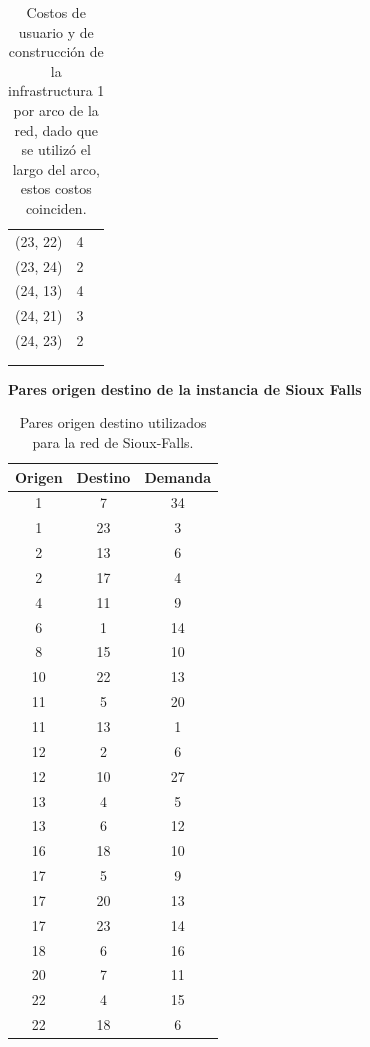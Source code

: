 \documentclass{article}
\begin{document}
\begin{table}[h!]
\begin{tabular}{ccc}
        (23, 22) & 4 \\
        (23, 24) & 2 \\
        (24, 13) & 4 \\
        (24, 21) & 3 \\
        (24, 23) & 2 \\
         & \\
         & \\
      \bottomrule
    \end{tabular}
    \caption{Costos de usuario y de construcción de la infrastructura 1 por arco de la red, dado que se utilizó el largo del arco, estos costos coinciden.}\label{table:siouxfallsgraphdata}
  \end{table}

  \begin{table}[h!]
    \centering
    \caption*{{\bf Pares origen destino de la instancia de Sioux Falls}}
    \begin{tabular}{ccc}
      \toprule
        Origen & Destino & Demanda \\
      \midrule
        1 & 7 & 34 \\
        1 & 23 & 3 \\
        2 & 13 & 6 \\
        2 & 17 & 4 \\
        4 & 11 & 9 \\
        6 & 1 & 14 \\
        8 & 15 & 10 \\
        10 & 22 & 13 \\
        11 & 5 & 20 \\
        11 & 13 & 1 \\
        12 & 2 & 6 \\
        12 & 10 & 27 \\
        13 & 4 & 5 \\
        13 & 6 & 12 \\
        16 & 18 & 10 \\
        17 & 5 & 9 \\
        17 & 20 & 13 \\
        17 & 23 & 14 \\
        18 & 6 & 16 \\
        20 & 7 & 11 \\
        22 & 4 & 15 \\
        22 & 18 & 6 \\
      \bottomrule
    \end{tabular}
    \caption{Pares origen destino utilizados para la red de Sioux-Falls.}\label{table:siouxfallsdemanddata}
  \end{table}
\end{document}
